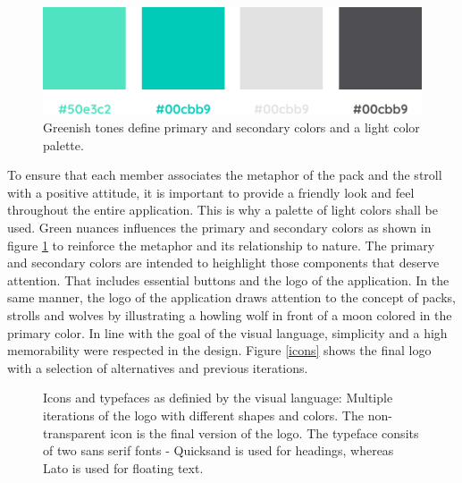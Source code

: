 \documentclass[12pt,numbers=noenddot,parskip,bibliography=totocnumbered,listof=totocnumbered,draft=true]{scrreprt}
\begin{document}
\begin{figure}
\centering
\includegraphics[width=0.875\linewidth]{colors.png}
\caption[Color palette]{Greenish tones define primary and secondary colors and a light color palette.}
\label{colors}
\end{figure}

To ensure that each member associates the metaphor of the pack and the stroll with a positive attitude, it is important to provide a friendly look and feel throughout the entire application. This is why a palette of light colors shall be used. Green nuances influences the primary and secondary colors as shown in figure \ref{colors} to reinforce the metaphor and its relationship to nature. The primary and secondary colors are intended to heighlight those components that deserve attention. That includes essential buttons and the logo of the application. In the same manner, the logo of the application draws attention to the concept of packs, strolls and wolves by illustrating a howling wolf in front of a moon colored in the primary color. In line with the goal of the visual language, simplicity and a high memorability were respected in the design. Figure \ref{icons} shows the final logo with a selection of alternatives and previous iterations.
 
\begin{figure}
\centering
{}
\qquad\qquad
{}
\caption[Icons and typefaces]{Icons and typefaces as definied by the visual language: Multiple iterations of the logo  with different shapes and colors. The non-transparent icon is the final version of the logo. The typeface  consits of two sans serif fonts - Quicksand is used for headings, whereas Lato is used for floating text.}
\end{figure}
\end{document}

